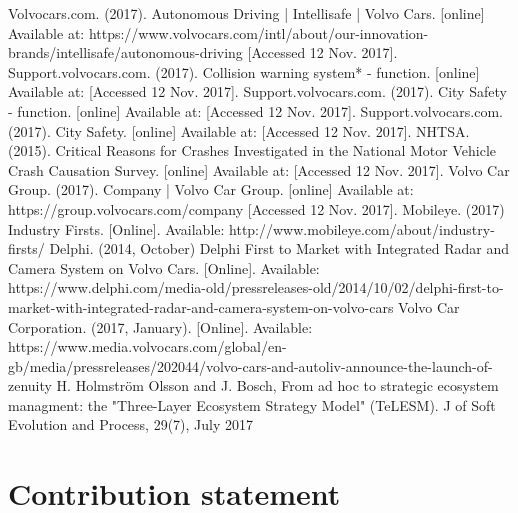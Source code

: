 \documentclass[conference]{IEEEtran}
\begin{document}
\begin{thebibliography}{00}
	 Volvocars.com. (2017). Autonomous Driving | Intellisafe | Volvo Cars. [online] Available at: https://www.volvocars.com/intl/about/our-innovation-brands/intellisafe/autonomous-driving [Accessed 12 Nov. 2017].
	 Support.volvocars.com. (2017). Collision warning system* - function. [online] Available at:  [Accessed 12 Nov. 2017].
	Support.volvocars.com. (2017). City Safety - function. [online] Available at:  [Accessed 12 Nov. 2017].
	 Support.volvocars.com. (2017). City Safety. [online] Available at:  [Accessed 12 Nov. 2017].
	 NHTSA. (2015). Critical Reasons for Crashes Investigated in the National Motor Vehicle Crash Causation Survey. [online] Available at:  [Accessed 12 Nov. 2017].
	 Volvo Car Group. (2017). Company | Volvo Car Group. [online] Available at: https://group.volvocars.com/company [Accessed 12 Nov. 2017].
	  Mobileye. (2017) Industry Firsts. [Online]. Available: http://www.mobileye.com/about/industry-firsts/
	 Delphi. (2014, October) Delphi First to Market with Integrated Radar and Camera System on Volvo Cars. [Online]. Available: https://www.delphi.com/media-old/pressreleases-old/2014/10/02/delphi-first-to-market-with-integrated-radar-and-camera-system-on-volvo-cars
	 Volvo Car Corporation. (2017, January). [Online]. Available: https://www.media.volvocars.com/global/en-gb/media/pressreleases/202044/volvo-cars-and-autoliv-announce-the-launch-of-zenuity
	 H. Holmstr\"{o}m Olsson and J. Bosch, From ad hoc to strategic ecosystem managment: the "Three-Layer Ecosystem Strategy Model" (TeLESM). J of Soft Evolution and Process, 29(7), July 2017
\end{thebibliography}

\pagebreak
\appendix
\section*{Contribution statement}
\end{document}
